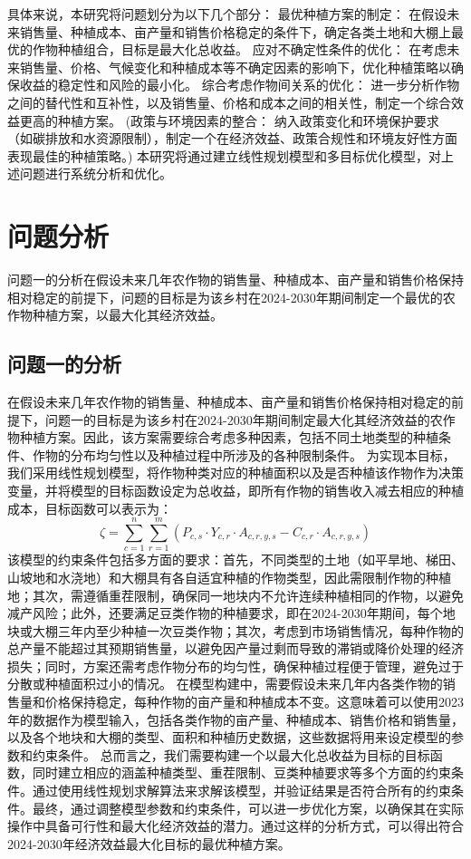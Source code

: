 \documentclass{cumcmthesis}
\begin{document}
具体来说，本研究将问题划分为以下几个部分：
最优种植方案的制定： 在假设未来销售量、种植成本、亩产量和销售价格稳定的条件下，确定各类土地和大棚上最优的作物种植组合，目标是最大化总收益。
应对不确定性条件的优化： 在考虑未来销售量、价格、气候变化和种植成本等不确定因素的影响下，优化种植策略以确保收益的稳定性和风险的最小化。
综合考虑作物间关系的优化： 进一步分析作物之间的替代性和互补性，以及销售量、价格和成本之间的相关性，制定一个综合效益更高的种植方案。
(政策与环境因素的整合： 纳入政策变化和环境保护要求（如碳排放和水资源限制），制定一个在经济效益、政策合规性和环境友好性方面表现最佳的种植策略。)
本研究将通过建立线性规划模型和多目标优化模型，对上述问题进行系统分析和优化。


\section{问题分析}
问题一的分析在假设未来几年农作物的销售量、种植成本、亩产量和销售价格保持相对稳定的前提下，问题的目标是为该乡村在2024-2030年期间制定一个最优的农作物种植方案，以最大化其经济效益。
\subsection{问题一的分析}
在假设未来几年农作物的销售量、种植成本、亩产量和销售价格保持相对稳定的前提下，问题一的目标是为该乡村在2024-2030年期间制定最大化其经济效益的农作物种植方案。因此，该方案需要综合考虑多种因素，包括不同土地类型的种植条件、作物的分布均匀性以及种植过程中所涉及的各种限制条件。
为实现本目标，我们采用线性规划模型，将作物种类对应的种植面积以及是否种植该作物作为决策变量，并将模型的目标函数设定为总收益，即所有作物的销售收入减去相应的种植成本，目标函数可以表示为：
\begin{equation}
    \zeta = \sum_{c=1}^{n} \sum_{r=1}^{m} (P_{c,s} \cdot Y_{c,r} \cdot A_{c,r,y,s} - C_{c,r} \cdot A_{c,r,y,s})
\end{equation}
该模型的约束条件包括多方面的要求：首先，不同类型的土地（如平旱地、梯田、山坡地和水浇地）和大棚具有各自适宜种植的作物类型，因此需限制作物的种植地；其次，需遵循重茬限制，确保同一地块内不允许连续种植相同的作物，以避免减产风险；此外，还要满足豆类作物的种植要求，即在2024-2030年期间，每个地块或大棚三年内至少种植一次豆类作物；其次，考虑到市场销售情况，每种作物的总产量不能超过其预期销售量，以避免因产量过剩而导致的滞销或降价处理的经济损失；同时，方案还需考虑作物分布的均匀性，确保种植过程便于管理，避免过于分散或种植面积过小的情况。
在模型构建中，需要假设未来几年内各类作物的销售量和价格保持稳定，每种作物的亩产量和种植成本不变。这意味着可以使用2023年的数据作为模型输入，包括各类作物的亩产量、种植成本、销售价格和销售量，以及各个地块和大棚的类型、面积和种植历史数据，这些数据将用来设定模型的参数和约束条件。
总而言之，我们需要构建一个以最大化总收益为目标的目标函数，同时建立相应的涵盖种植类型、重茬限制、豆类种植要求等多个方面的约束条件。通过使用线性规划求解算法来求解该模型，并验证结果是否符合所有的约束条件。最终，通过调整模型参数和约束条件，可以进一步优化方案，以确保其在实际操作中具备可行性和最大化经济效益的潜力。通过这样的分析方式，可以得出符合2024-2030年经济效益最大化目标的最优种植方案。
\end{document}
